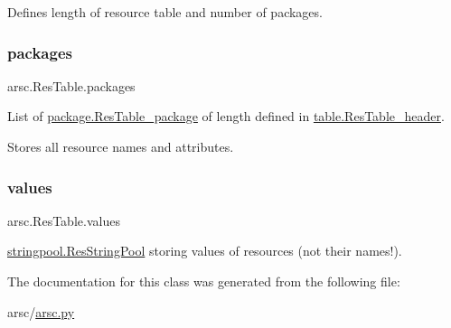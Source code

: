 Defines length of resource table and number of packages. \mbox{\label{classarsc_1_1ResTable_a7446528982666902550f44c8037a3c5a}} 
\subsubsection{\texorpdfstring{packages}{packages}}
{\footnotesize\ttfamily arsc.\+Res\+Table.\+packages}



List of \mbox{\hyperlink{classpackage_1_1ResTable__package}{package.\+Res\+Table\+\_\+package}} of length defined in \mbox{\hyperlink{classtable_1_1ResTable__header}{table.\+Res\+Table\+\_\+header}}. 

Stores all resource names and attributes. \mbox{\label{classarsc_1_1ResTable_aa32fa0072c5535ef46837e8e659c6ab5}} 
\subsubsection{\texorpdfstring{values}{values}}
{\footnotesize\ttfamily arsc.\+Res\+Table.\+values}



\mbox{\hyperlink{classstringpool_1_1ResStringPool}{stringpool.\+Res\+String\+Pool}} storing values of resources (not their names!). 



The documentation for this class was generated from the following file\+:\begin{DoxyCompactItemize}
\item 
arsc/\mbox{\hyperlink{arsc_8py}{arsc.\+py}}\end{DoxyCompactItemize}
